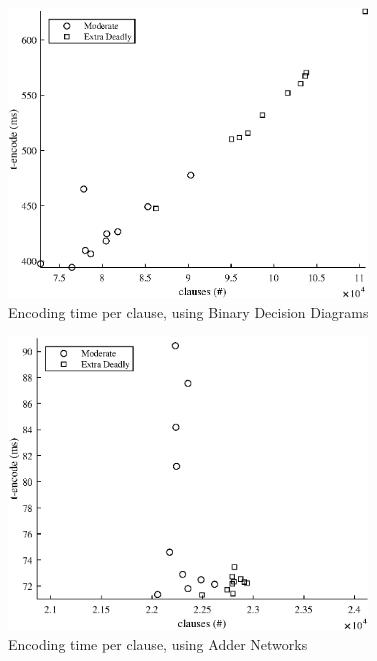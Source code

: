 \FloatBarrier
{
\renewcommand{\figurename}{Plot}
\begin{figure}
    \centering
    \includegraphics[width = 0.85\textwidth]{Figures/killer_BDD_encode.eps}
    \caption{Encoding time per clause, using Binary Decision Diagrams}
    \label{killerBDDencode}
\end{figure}
\begin{figure}
    \centering
    \includegraphics[width = 0.85\textwidth]{Figures/killer_AN_encode.eps}
    \caption{Encoding time per clause, using Adder Networks}
    \label{killerANencode}
\end{figure}

}
